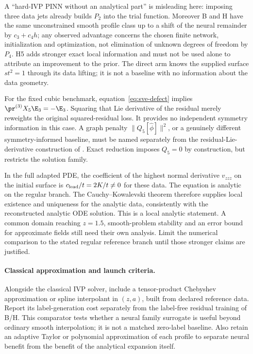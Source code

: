A ``hard-IVP PINN without an analytical part'' is misleading here: imposing
three data jets already builds $P_2$ into the trial function. Moreover B and H
have the same unconstrained smooth profile class up to a shift of the neural
remainder by $c_3+c_4h$; any observed advantage concerns the chosen finite
network, initialization and optimization, not elimination of unknown
degrees of freedom by $P_4$. H5 adds stronger exact local information and
must not be used alone to attribute an improvement to the prior.
The direct arm knows the supplied surface $st^2=1$ through its data lifting;
it is not a baseline with no information about the data geometry.

For the fixed cubic benchmark, equation~\eqref{eq:sve-defect} implies
$\pr^{(3)}X_5\E_3=-\E_3$. Squaring that Lie derivative of the residual
merely reweights the original squared-residual loss. It provides no
independent symmetry information in this case. A graph penalty
$\|Q_5[\widehat\phi]\|^2$, or a genuinely different symmetry-informed
baseline, must be named separately from the residual-Lie-derivative
construction of \citet{sympinn}. Exact reduction imposes $Q_5=0$ by
construction, but restricts the solution family.

In the full adapted PDE, the coefficient of the highest normal derivative
$v_{zzz}$ on the initial surface is $c_{\rm lead}/t=2K/t\ne0$ for these
data. The equation is analytic on the regular branch. The
Cauchy--Kowalevski theorem therefore supplies local existence and uniqueness
for the analytic data, consistently with the reconstructed analytic ODE
solution. This is a local analytic statement. A common domain reaching
$z=1.5$, smooth-problem stability and an error bound for approximate fields
still need their own analysis. Limit the numerical comparison to the stated
regular reference branch until those stronger claims are justified.

\paragraph{Classical approximation and launch criteria.}
Alongside the classical IVP solver, include a tensor-product Chebyshev
approximation or spline interpolant in $(z,a)$, built from declared
reference data. Report its label-generation cost separately from the
label-free residual training of B/H. This comparator tests whether a neural
family surrogate is useful beyond ordinary smooth interpolation; it is
not a matched zero-label baseline. Also retain an adaptive Taylor or
polynomial approximation of each profile to separate neural benefit from
the benefit of the analytical expansion itself.

